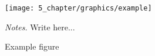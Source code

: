 \begin{figure}[htbp]
\centering
\texttt{[image: 5\_chapter/graphics/example]}
\caption{\label{fig:chapter4-example}Example figure}
\begin{flushleft}
\emph{Notes.} Write here...
\end{flushleft}
\end{figure}
